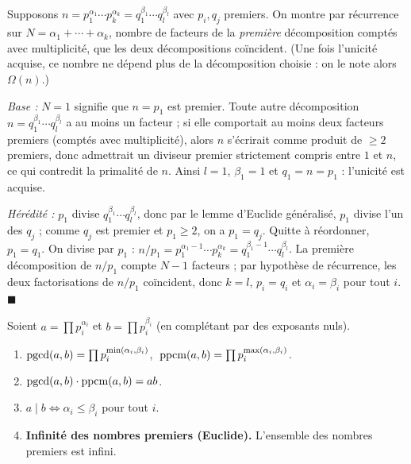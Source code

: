 \begin{mdframed}[style=proofbar]
  Supposons $n = p_1^{\alpha_1}\cdots p_k^{\alpha_k} = q_1^{\beta_1}\cdots q_l^{\beta_l}$
  avec $p_i, q_j$ premiers. On montre par récurrence sur
  $N = \alpha_1 + \cdots + \alpha_k$, nombre de facteurs de la \emph{première}
  décomposition comptés avec multiplicité, que les deux décompositions coïncident.
  (Une fois l'unicité acquise, ce nombre ne dépend plus de la décomposition choisie :
  on le note alors $\Omega(n)$.)

  \textit{Base :} $N=1$ signifie que $n = p_1$ est premier. Toute autre
  décomposition $n = q_1^{\beta_1}\cdots q_l^{\beta_l}$ a au moins un facteur ;
  si elle comportait au moins deux facteurs premiers (comptés avec multiplicité),
  alors $n$ s'écrirait comme produit de $\ge 2$ premiers, donc admettrait un diviseur
  premier strictement compris entre $1$ et $n$, ce qui contredit la primalité de $n$.
  Ainsi $l=1$, $\beta_1=1$ et $q_1 = n = p_1$ : l'unicité est acquise.

  \textit{Hérédité :} $p_1$ divise $q_1^{\beta_1}\cdots q_l^{\beta_l}$, donc par le
  lemme d'Euclide généralisé, $p_1$ divise l'un des $q_j$ ; comme $q_j$ est premier
  et $p_1 \geq 2$, on a $p_1 = q_j$.
  Quitte à réordonner, $p_1 = q_1$. On divise par $p_1$ :
  $n/p_1 = p_1^{\alpha_1-1}\cdots p_k^{\alpha_k} = q_1^{\beta_1-1}\cdots q_l^{\beta_l}$.
  La première décomposition de $n/p_1$ compte $N-1$ facteurs ; par hypothèse de
  récurrence, les deux factorisations de
  $n/p_1$ coïncident, donc $k=l$, $p_i=q_i$ et $\alpha_i=\beta_i$ pour tout $i$.
  $\blacksquare$
\end{mdframed}

\decsep{}


\begin{tcolorbox}[thmbox]
  Soient $a = \prod p_i^{\alpha_i}$ et $b = \prod p_i^{\beta_i}$
  (en complétant par des exposants nuls).
  \begin{enumerate}
    \item $\operatorname{pgcd}(a,b) = \prod p_i^{\min(\alpha_i,\beta_i)}$,
          $\;\operatorname{ppcm}(a,b) = \prod p_i^{\max(\alpha_i,\beta_i)}$.
    \item $\operatorname{pgcd}(a,b) \cdot \operatorname{ppcm}(a,b) = ab$.
    \item $a \mid b \iff \alpha_i \leq \beta_i$ pour tout $i$.
    \item \textbf{Infinité des nombres premiers (Euclide).}\enspace%
    L'ensemble des nombres premiers est infini.
  \end{enumerate}
\end{tcolorbox}


